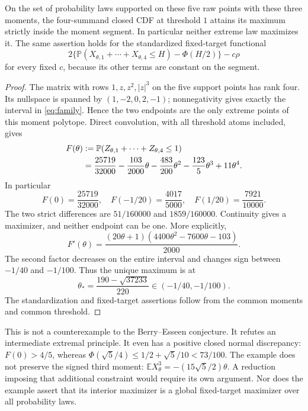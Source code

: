\documentclass[11pt,a4paper]{article}
\newcommand{\E}{\mathbb E}\newcommand{\Pp}{\mathbb P}
\begin{document}
\begin{proposition}\label{prop:obstruction}
On the set of probability laws supported on these five raw points with
these three moments, the four-summand closed CDF at threshold $1$ attains
its maximum strictly inside the moment segment. In particular neither
extreme law maximizes it. The same assertion holds for the standardized
fixed-target functional
\[
 2\{\Pp(X_{\theta,1}+\cdots+X_{\theta,4}\le H)-\Phi(H/2)\}
                          -c\rho
\]
for every fixed $c$, because its other terms are constant on the segment.
\end{proposition}
\begin{proof}
The matrix with rows $1,z,z^2,|z|^3$ on the five support points has rank
four. Its nullspace is spanned by $(1,-2,0,2,-1)$; nonnegativity gives
exactly the interval in \eqref{eq:family}. Hence the two endpoints are
the only extreme points of this moment polytope.
Direct convolution, with all threshold atoms included, gives
\begin{align}\label{eq:cdf}
 F(\theta)&:=\Pp(Z_{\theta,1}+\cdots+Z_{\theta,4}\le1)\notag\\
 &=\frac{25719}{32000}-\frac{103}{2000}\theta
       -\frac{483}{200}\theta^2-\frac{123}{5}\theta^3+11\theta^4.
\end{align}
In particular
\[
 F(0)=\frac{25719}{32000},\quad
 F(-1/20)=\frac{4017}{5000},\quad
 F(1/20)=\frac{7921}{10000}.
\]
The two strict differences are $51/160000$ and $1859/160000$.
Continuity gives a maximizer, and neither endpoint can be one.
More explicitly,
\[
 F'(\theta)=\frac{(20\theta+1)(4400\theta^2-7600\theta-103)}{2000}.
\]
The second factor decreases on the entire interval and changes sign
between $-1/40$ and $-1/100$. Thus the unique maximum is at
\[
 \theta_* =\frac{190-\sqrt{37233}}{220}\in(-1/40,-1/100).
\]
The standardization and fixed-target assertions follow from the common
moments and common threshold.
\end{proof}

This is not a counterexample to the Berry--Esseen conjecture. It refutes
an intermediate extremal principle. It even has a positive closed
normal discrepancy: $F(0)>4/5$, whereas
$\Phi(\sqrt5/4)\le1/2+\sqrt5/10<73/100$.
The example does not preserve the signed third moment:
$\E X_\theta^3=-(15\sqrt5/2)\theta$. A reduction imposing that additional
constraint would require its own argument. Nor does the example assert
that its interior maximizer is a global fixed-target maximizer over all
probability laws.
\end{document}
